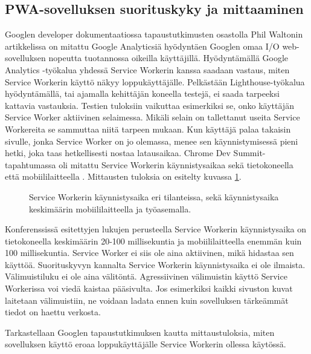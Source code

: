 \documentclass{tktltiki}
\begin{document}
\clearpage


\subsection{PWA-sovelluksen suorituskyky ja mittaaminen}

Googlen developer dokumentaatiossa tapaustutkimusten osastolla Phil Waltonin artikkelissa \cite{Walton} on mitattu Google Analyticsiä hyödyntäen Googlen omaa I/O web-sovelluksen nopeutta tuotannossa oikeilla käyttäjillä. Hyödyntämällä Google Analytics -työkalua yhdessä Service Workerin kanssa saadaan vastaus, miten Service Workerin käyttö näkyy loppukäyttäjälle. Pelkästään Lighthouse-työkalua hyödyntämällä, tai ajamalla kehittäjän koneella testejä, ei saada tarpeeksi kattavia vastauksia. Testien tuloksiin vaikuttaa esimerkiksi se, onko käyttäjän Service Worker aktiivinen selaimessa. Mikäli selain on tallettanut useita Service Workereita se sammuttaa niitä tarpeen mukaan. Kun käyttäjä palaa takaisin sivulle, jonka Service Worker on jo olemassa, menee sen käynnistymisessä pieni hetki, joka taas hetkellisesti nostaa latausaikaa. Chrome Dev Summit-tapahtumassa oli mitattu Service Workerin käynnistysaikaa sekä tietokoneella että mobiililaitteella \cite{GoogleDevSummit}. Mittausten tuloksia on esitelty kuvassa \ref{serviceworker_starttime}.

\begin{figure}[h]
\begin{center}
\caption{Service Workerin käynnistysaika eri tilanteissa, sekä käynnistysaika keskimäärin mobiililaitteella ja työasemalla.}
\label{serviceworker_starttime}
\end{center}
\end{figure}

Konferenssissä esitettyjen lukujen perusteella Service Workerin käynnistysaika on tietokoneella keskimäärin 20-100 millisekuntia ja mobiililaitteella enemmän kuin 100 millisekuntia. Service Worker ei siis ole aina aktiivinen, mikä hidastaa sen käyttöä. Suorituskyvyn kannalta Service Workerin käynnistysaika ei ole ilmaista. Välimuistiluku ei ole aina välitöntä. Agressiivinen välimuistin käyttö Service Workerissa voi viedä kaistaa pääsivulta. Jos esimerkiksi kaikki sivuston kuvat laitetaan välimuistiin, ne voidaan ladata ennen kuin sovelluksen tärkeämmät tiedot on haettu verkosta.

Tarkastellaan Googlen tapaustutkimuksen kautta mittaustuloksia, miten sovelluksen käyttö eroaa loppukäyttäjälle Service Workerin ollessa käytössä.
\end{document}
